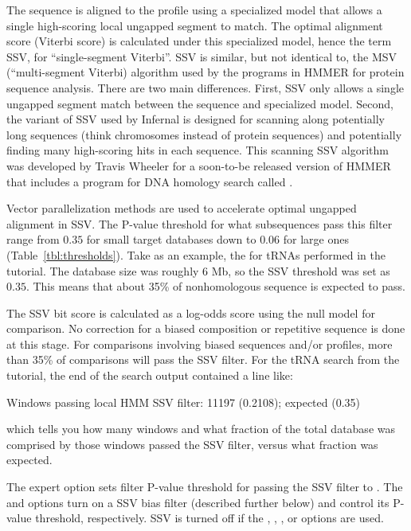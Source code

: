 The sequence is aligned to the profile using a specialized model that
allows a single high-scoring local ungapped segment to match.  The
optimal alignment score (Viterbi score) is calculated under this
specialized model, hence the term SSV, for ``single-segment
Viterbi''. SSV is similar, but not identical to, the MSV
(``multi-segment Viterbi) algorithm used by the programs in HMMER 
for protein sequence analysis. There are two main differences. First,
SSV only allows a single ungapped segment match between the sequence
and specialized model. Second, the variant of SSV used by Infernal is
designed for scanning along potentially long sequences (think
chromosomes instead of protein sequences) and potentially finding many
high-scoring hits in each sequence. This scanning SSV algorithm was
developed by Travis Wheeler for a soon-to-be released version of HMMER
that includes a program for DNA homology search called .

Vector parallelization methods are used to accelerate optimal ungapped
alignment in SSV. The P-value threshold for what subsequences pass
this filter range from $0.35$ for small target databases down to
$0.06$ for large ones (Table~\ref{tbl:thresholds}). Take as an
example, the  for tRNAs performed in the tutorial. The
database size was roughly 6 Mb, so the SSV threshold was set as
$0.35$. This means that about 35\% of nonhomologous sequence is
expected to pass.

The SSV bit score is calculated as a log-odds score using the null
model for comparison. No correction for a biased composition or
repetitive sequence is done at this stage. For comparisons involving
biased sequences and/or profiles, more than 35\% of comparisons will
pass the SSV filter. For the tRNA search from the tutorial, the end of
the search output contained a line like:

\begin{sreoutput}
Windows   passing  local HMM SSV           filter:           11197  (0.2108); expected (0.35)
\end{sreoutput}

which tells you how many windows and what fraction of the total
database was comprised by those windows passed the 
SSV filter, versus what fraction was expected.

The  expert option sets filter P-value threshold for
passing the SSV filter to . The  and
 options turn on a SSV bias filter (described further
below) and control its P-value threshold, respectively. SSV is turned
off if the , , , or
 options are used.

